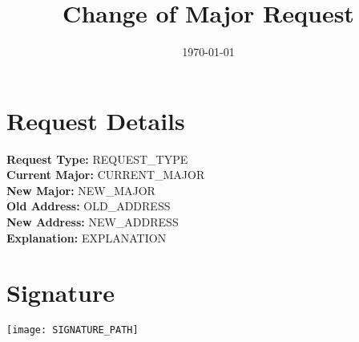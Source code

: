 \documentclass{article}
\begin{document}
\title{Change of Major Request}
\date{\today}

\maketitle



\section*{Request Details}
\textbf{Request Type:} REQUEST_TYPE \\
\textbf{Current Major:} CURRENT_MAJOR \\
\textbf{New Major:} NEW_MAJOR \\
\textbf{Old Address:} OLD_ADDRESS \\
\textbf{New Address:} NEW_ADDRESS \\
\textbf{Explanation:} EXPLANATION

\section*{Signature}
\vspace{1cm}
\texttt{[image: SIGNATURE\_PATH]} %
\end{document}
